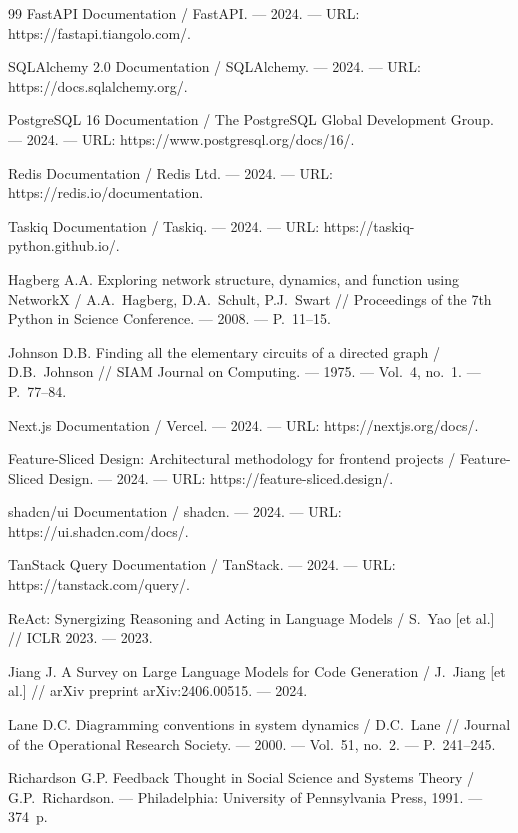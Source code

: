 \begin{thebibliography}{99}
    FastAPI Documentation / FastAPI. --- 2024. --- URL: https://fastapi.tiangolo.com/.

    SQLAlchemy 2.0 Documentation / SQLAlchemy. --- 2024. --- URL: https://docs.sqlalchemy.org/.

    PostgreSQL 16 Documentation / The PostgreSQL Global Development Group. --- 2024. --- URL: https://www.postgresql.org/docs/16/.

    Redis Documentation / Redis Ltd. --- 2024. --- URL: https://redis.io/documentation.

    Taskiq Documentation / Taskiq. --- 2024. --- URL: https://taskiq-python.github.io/.

    Hagberg A.A. Exploring network structure, dynamics, and function using NetworkX / A.A.~Hagberg, D.A.~Schult, P.J.~Swart // Proceedings of the 7th Python in Science Conference. --- 2008. --- P.~11--15.

    Johnson D.B. Finding all the elementary circuits of a directed graph / D.B.~Johnson // SIAM Journal on Computing. --- 1975. --- Vol.~4, no.~1. --- P.~77--84.

    Next.js Documentation / Vercel. --- 2024. --- URL: https://nextjs.org/docs/.

    Feature-Sliced Design: Architectural methodology for frontend projects / Feature-Sliced Design. --- 2024. --- URL: https://feature-sliced.design/.

    shadcn/ui Documentation / shadcn. --- 2024. --- URL: https://ui.shadcn.com/docs/.

    TanStack Query Documentation / TanStack. --- 2024. --- URL: https://tanstack.com/query/.

    ReAct: Synergizing Reasoning and Acting in Language Models / S.~Yao [et al.] // ICLR 2023. --- 2023.

    Jiang J. A Survey on Large Language Models for Code Generation / J.~Jiang [et al.] // arXiv preprint arXiv:2406.00515. --- 2024.

    Lane D.C. Diagramming conventions in system dynamics / D.C.~Lane // Journal of the Operational Research Society. --- 2000. --- Vol.~51, no.~2. --- P.~241--245.

    Richardson G.P. Feedback Thought in Social Science and Systems Theory / G.P.~Richardson. --- Philadelphia: University of Pennsylvania Press, 1991. --- 374~p.

\end{thebibliography}

